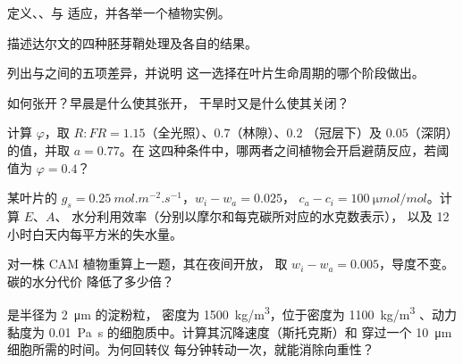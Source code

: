 \begin{exercise}[$\star$]\label{exo:b2:plant-plasticity:1}
定义、、与
适应，并各举一个植物实例。
\end{exercise}

\begin{exercise}[$\star$]\label{exo:b2:plant-plasticity:2}
描述达尔文的四种胚芽鞘处理及各自的结果。
\end{exercise}

\begin{exercise}[$\star$]\label{exo:b2:plant-plasticity:3}
列出与之间的五项差异，并说明
这一选择在叶片生命周期的哪个阶段做出。
\end{exercise}

\begin{exercise}[$\star$]\label{exo:b2:plant-plasticity:4}
如何张开？早晨是什么使其张开，
干旱时又是什么使其关闭？
\end{exercise}

\begin{exercise}[$\star\star$]\label{exo:b2:plant-plasticity:5}
计算 $\varphi$，取 $R{:}FR = 1.15$（全光照）、$0.7$（林隙）、$0.2$
（冠层下）及 $0.05$（深阴）的值，并取 $a = 0.77$。在
这四种条件中，哪两者之间植物会开启避荫反应，若阈值为
$\varphi = 0.4$？
\end{exercise}

\begin{exercise}[$\star\star$]\label{exo:b2:plant-plasticity:6}
某叶片的 $g_s = \qty{0.25}{mol.m^{-2}.s^{-1}}$，$w_i - w_a = 0.025$，
$c_a - c_i = \qty{100}{\micro mol/mol}$。计算 $E$、$A$、
水分利用效率（分别以摩尔和每克碳所对应的水克数表示），
以及 12 小时白天内每平方米的失水量。
\end{exercise}

\begin{exercise}[$\star\star$]\label{exo:b2:plant-plasticity:7}
对一株 CAM 植物重算上一题，其在夜间开放，
取 $w_i - w_a = 0.005$，导度不变。碳的水分代价
降低了多少倍？
\end{exercise}

\begin{exercise}[$\star\star$]\label{exo:b2:plant-plasticity:8}
是半径为 \qty{2}{\micro m} 的淀粉粒，
密度为 \qty{1500}{kg/m^3}，位于密度为 \qty{1100}{kg/m^3}
、动力黏度为 \qty{0.01}{Pa.s} 的细胞质中。计算其沉降速度（斯托克斯）和
穿过一个 \qty{10}{\micro m} 细胞所需的时间。为何回转仪
每分钟转动一次，就能消除向重性？
\end{exercise}

